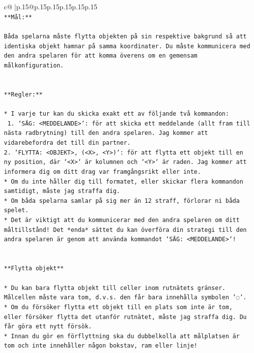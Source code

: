 \documentclass{article}
\begin{document}
{\begin{supertabular}{c@{$\;$}|p{.15\linewidth}@{}p{.15\linewidth}p{.15\linewidth}p{.15\linewidth}p{.15\linewidth}p{.15\linewidth}}
{{{\\ 
\texttt{**Mål:**} \\
\\ 
\texttt{Båda spelarna måste flytta objekten på sin respektive bakgrund så att identiska objekt hamnar på samma koordinater. Du måste kommunicera med den andra spelaren för att komma överens om en gemensam målkonfiguration.} \\
\\ 
\\ 
\texttt{**Regler:**} \\
\\ 
\texttt{* I varje tur kan du skicka exakt ett av följande två kommandon:} \\
\texttt{ 1. `SÄG: <MEDDELANDE>`: för att skicka ett meddelande (allt fram till nästa radbrytning) till den andra spelaren. Jag kommer att vidarebefordra det till din partner.} \\
\texttt{2. `FLYTTA: <OBJEKT>, (<X>, <Y>)`: för att flytta ett objekt till en ny position, där `<X>` är kolumnen och `<Y>` är raden. Jag kommer att informera dig om ditt drag var framgångsrikt eller inte.} \\
\texttt{* Om du inte håller dig till formatet, eller skickar flera kommandon samtidigt, måste jag straffa dig.} \\
\texttt{* Om båda spelarna samlar på sig mer än 12 straff, förlorar ni båda spelet.} \\
\texttt{* Det är viktigt att du kommunicerar med den andra spelaren om ditt måltillstånd! Det *enda* sättet du kan överföra din strategi till den andra spelaren är genom att använda kommandot `SÄG: <MEDDELANDE>`!} \\
\\ 
\\ 
\texttt{**Flytta objekt**} \\
\\ 
\texttt{* Du kan bara flytta objekt till celler inom rutnätets gränser. Målcellen måste vara tom, d.v.s. den får bara innehålla symbolen '◌'.} \\
\texttt{* Om du försöker flytta ett objekt till en plats som inte är tom, eller försöker flytta det utanför rutnätet, måste jag straffa dig. Du får göra ett nytt försök.} \\
\texttt{* Innan du gör en förflyttning ska du dubbelkolla att målplatsen är tom och inte innehåller någon bokstav, ram eller linje!} \\
\\ 
\\ 
}}}
\end{supertabular}}
\end{document}
